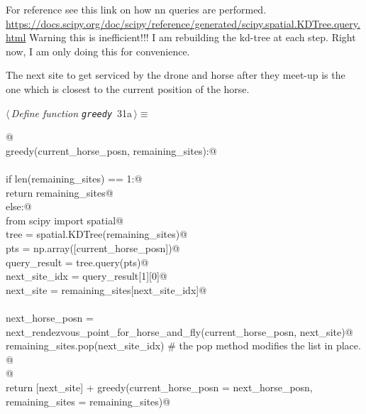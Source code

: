 \documentclass[11.5pt]{report}
\begin{document}
For reference see this link on how nn queries are performed. 
\url{https://docs.scipy.org/doc/scipy/reference/generated/scipy.spatial.KDTree.query.html}
Warning this is inefficient!!! I am rebuilding the 
kd-tree at each step. Right now, I am only doing this 
for convenience.

The next site to get serviced by the drone and horse after they meet-up
is the one which is closest to the current position of the horse. 


\begin{flushleft} \small
\begin{minipage}{\linewidth}\label{scrap39}\raggedright\small
{} $\langle\,${\itshape Define function \verb|greedy|}\nobreak\ {\footnotesize {31a}}$\,\rangle\equiv$
\vspace{-1ex}
\begin{list}{}{} \item
\mbox{}\verb@   @\\
\mbox{}\verb@def greedy(current_horse_posn, remaining_sites):@\\
\mbox{}\verb@@\\
\mbox{}\verb@    if len(remaining_sites) == 1:@\\
\mbox{}\verb@          return remaining_sites@\\
\mbox{}\verb@    else:@\\
\mbox{}\verb@          from scipy import spatial@\\
\mbox{}\verb@          tree          = spatial.KDTree(remaining_sites)@\\
\mbox{}\verb@          pts           = np.array([current_horse_posn])@\\
\mbox{}\verb@          query_result  = tree.query(pts)@\\
\mbox{}\verb@          next_site_idx = query_result[1][0]@\\
\mbox{}\verb@          next_site     = remaining_sites[next_site_idx]@\\
\mbox{}\verb@@\\
\mbox{}\verb@          next_horse_posn = next_rendezvous_point_for_horse_and_fly(current_horse_posn, next_site)@\\
\mbox{}\verb@          remaining_sites.pop(next_site_idx) # the pop method modifies the list in place. @\\
\mbox{}\verb@                 @\\
\mbox{}\verb@          return [next_site] + greedy(current_horse_posn = next_horse_posn, remaining_sites = remaining_sites)@\\

\end{list}
\end{minipage}
\end{flushleft}
\end{document}
